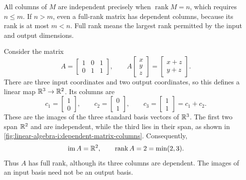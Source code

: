 All columns of \(M\) are independent precisely when
\(\operatorname{rank}M=n\), which requires \(n\leq m\).
If \(n>m\), even a full-rank matrix has dependent columns, because
its rank is at most \(m<n\). Full rank means the largest rank permitted
by the input and output dimensions.

\begin{example}
  \label{ex:linear-algebra-i:full-rank-dependent-columns}
  Consider the matrix
  \[
    A=\begin{bmatrix}1&0&1\\0&1&1\end{bmatrix},
    \qquad
    A\begin{bmatrix}x\\y\\z\end{bmatrix}
      =\begin{bmatrix}x+z\\y+z\end{bmatrix}.
  \]
  There are three input coordinates and two output coordinates, so
  this defines a linear map \(\mathbb{R}^3\to\mathbb{R}^2\). Its columns are
  \[
    c_1=\begin{bmatrix}1\\0\end{bmatrix},\qquad
    c_2=\begin{bmatrix}0\\1\end{bmatrix},\qquad
    c_3=\begin{bmatrix}1\\1\end{bmatrix}=c_1+c_2.
  \]
  These are the images of the three standard basis vectors of \(\mathbb{R}^3\).
  The first two span \(\R^2\) and are independent, while the third
  lies in their span, as shown in
  \autoref{fig:linear-algebra-i:dependent-matrix-columns}.
  Consequently,
  \[
    \operatorname{im}A=\mathbb{R}^2,
    \qquad \operatorname{rank}A=2=\min(2,3).
  \]
  Thus \(A\) has full rank, although its three columns are dependent.
  The images of an input basis need not be an output basis.
  \begin{marginfigure}
    \centering
    
    \caption[Full rank with dependent columns]{The three columns of
      \(A\) in the output plane. The first two form a basis of
      \(\R^2\). The third is their sum and contributes no additional
      independent direction.}
    \label{fig:linear-algebra-i:dependent-matrix-columns}
  \end{marginfigure}


\end{example}
